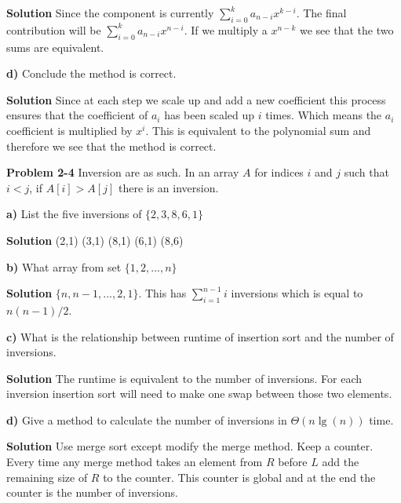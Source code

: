 \documentclass{article}
\begin{document}
\textbf{Solution} Since the component is currently $\sum\limits_{i=0}^{k} a_{n-i}x^{k-i}$. The final contribution will be $\sum\limits_{i=0}^{k} a_{n-i}x^{n-i}$. If we multiply a $x^{n-k}$ we see that the two sums are equivalent.

\medskip

\textbf{d)} Conclude the method is correct.

\medskip

\textbf{Solution} Since at each step we scale up and add a new coefficient this process ensures that the coefficient of $a_i$ has been scaled up $i$ times. Which means the $a_i$ coefficient is multiplied by $x^i$. This is equivalent to the polynomial sum and therefore we see that the method is correct.

\hrulefill

\medskip

\textbf{Problem 2-4} Inversion are as such. In an array $A$ for indices $i$ and $j$ such that $i < j$, if $A[i] > A[j]$ there is an inversion.

\medskip

\textbf{a)} List the five inversions of $\{2,3,8,6,1\}$

\medskip

\textbf{Solution} (2,1) (3,1) (8,1) (6,1) (8,6)

\medskip

\textbf{b)} What array from set $\{1,2,...,n\}$

\medskip

\textbf{Solution} $\{n,n-1,...,2,1\}$. This has $\sum\limits_{i = 1}^{n-1} i$ inversions which is equal to $n(n-1)/2$.

\medskip

\textbf{c)} What is the relationship between runtime of insertion sort and the number of inversions.

\medskip

\textbf{Solution} The runtime is equivalent to the number of inversions. For each inversion insertion sort will need to make one swap between those two elements.

\medskip

\textbf{d)} Give a method to calculate the number of inversions in $\Theta(n\lg(n))$ time.

\medskip

\textbf{Solution} Use merge sort except modify the merge method. Keep a counter. Every time any merge method takes an element from $R$ before $L$ add the remaining size of $R$ to the counter. This counter is global and at the end the counter is the number of inversions.

\hrulefill
\end{document}
